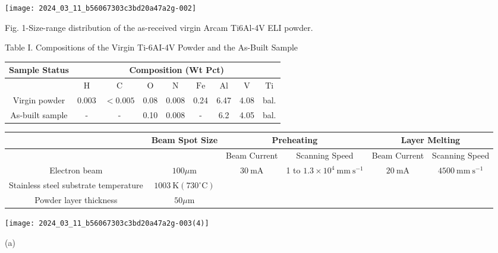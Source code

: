 \documentclass[10pt]{article}
\begin{document}
\begin{center}
\texttt{[image: 2024\_03\_11\_b56067303c3bd20a47a2g-002]}
\end{center}

Fig. 1-Size-range distribution of the as-received virgin Arcam Ti6Al-4V ELI powder.

Table I. Compositions of the Virgin Ti-6AI-4V Powder and the As-Built Sample

\begin{center}
\begin{tabular}{|c|c|c|c|c|c|c|c|c|}
\hline
\multirow[b]{2}{*}{Sample Status} & \multicolumn{8}{|c|}{Composition (Wt Pct)} \\
\hline
 & $\mathrm{H}$ & $\mathrm{C}$ & $\mathrm{O}$ & $\mathrm{N}$ & $\mathrm{Fe}$ & $\mathrm{Al}$ & $\mathrm{V}$ & $\mathrm{Ti}$ \\
\hline
Virgin powder & 0.003 & $<0.005$ & 0.08 & 0.008 & 0.24 & 6.47 & 4.08 & bal. \\
\hline
As-built sample & - & - & 0.10 & 0.008 & - & 6.2 & 4.05 & bal. \\
\hline
\end{tabular}
\end{center}

\begin{center}
\begin{tabular}{|c|c|c|c|c|c|}
\hline
 & \multirow[b]{2}{*}{Beam Spot Size} & \multicolumn{2}{|c|}{Preheating} & \multicolumn{2}{|c|}{Layer Melting} \\
\hline
 &  & Beam Current & Scanning Speed & Beam Current & Scanning Speed \\
\hline
Electron beam & $100 \mu \mathrm{m}$ & $30 \mathrm{~mA}$ & 1 to $1.3 \times 10^{4} \mathrm{~mm} \mathrm{~s}^{-1}$ & $20 \mathrm{~mA}$ & $4500 \mathrm{~mm} \mathrm{~s}^{-1}$ \\
\hline
Stainless steel substrate temperature & $1003 \mathrm{~K}\left(730^{\circ} \mathrm{C}\right)$ &  &  &  &  \\
\hline
Powder layer thickness & $50 \mu \mathrm{m}$ &  &  &  &  \\
\hline
\end{tabular}
\end{center}

\begin{center}
\texttt{[image: 2024\_03\_11\_b56067303c3bd20a47a2g-003(4)]}
\end{center}

(a)
\end{document}
